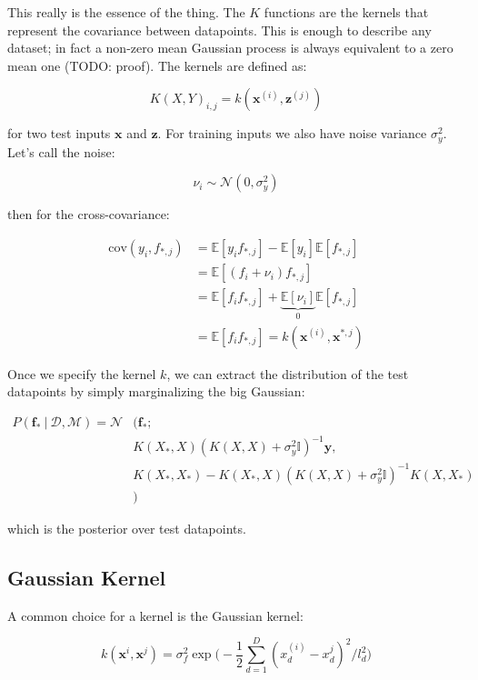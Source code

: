 \documentclass{article}
\newcommand{\vf}[1]{\mathbf{#1}}
\newcommand{\normal}{\mathcal{N}}
\newcommand{\bx}{\vf{x}}
\newcommand{\by}{\vf{y}}
\newcommand{\bz}{\vf{z}}
\newcommand{\bfu}{\vf{f}}
\newcommand{\giv}{\ |\ }
\newcommand{\data}{\mathcal{D}}
\newcommand{\model}{\mathcal{M}}
\newcommand{\expect}{\mathbb{E}}
\begin{document}
This really is the essence of the thing. The $K$ functions are the kernels that represent the covariance between datapoints. This is enough to describe any dataset; in fact a non-zero mean Gaussian process is always equivalent to a zero mean one (TODO: proof). The kernels are defined as:

\begin{equation*}
    K(X, Y)_{i, j} = k(\bx^{(i)}, \bz^{(j)})
\end{equation*}

for two test inputs $\bx$ and $\bz$. For training inputs we also have noise variance $\sigma_y^2$. Let's call the noise:

\begin{equation*}
    \nu_i \sim \normal(0, \sigma_y^2)
\end{equation*}

then for the cross-covariance:

\begin{align*}
    \text{cov}(y_i, f_{*, j}) &= \expect[y_i f_{*, j}] -
        \expect[y_i] \expect[f_{*,j}] \\
        &= \expect[(f_i + \nu_i) f_{*, j}] \\
        &= \expect[f_i f_{*,j}] + \underbrace{\expect[\nu_i]}_0\expect[f_{*, j}] \\
        &= \expect[f_i f_{*,j}] = k(\bx^{(i)}, \bx^{*, j})
\end{align*}

Once we specify the kernel $k$, we can extract the distribution of the test datapoints by simply marginalizing the big Gaussian:

\begin{align*}
    P(\bfu_* \giv \data, \model) =
        \normal&(\bfu_*; \\
        &K(X_*, X)(K(X, X) + \sigma_y^2 \mathbb{I})^{-1} \by, \\
        &K(X_*, X_*) - K(X_*, X)(K(X, X) + \sigma_y^2 \mathbb{I})^{-1}K(X, X_*) \\
        &)
\end{align*}

which is the posterior over test datapoints.

\subsection{Gaussian Kernel}
A common choice for a kernel is the Gaussian kernel:

\begin{equation*}
    k(\bx^{i}, \bx^{j}) = 
        \sigma_f^2 \exp\bigg( 
            -\frac{1}{2} \sum_{d=1}^D (x_d^{(i)} - x_d^{j})^2 /l_d^2    
        \bigg)
\end{equation*}
\end{document}

